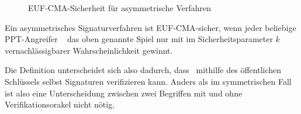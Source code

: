 \begin{definition}
\begin{figure}
\begin{center}
{ }
      \caption{EUF-CMA-Sicherheit für asymmetrische Verfahren}
      \label{abb:euf-cma-asym}
    \end{center}
  \end{figure}

  Ein asymmetrisches Signaturverfahren ist EUF-CMA-sicher, wenn jeder
  beliebige PPT-Angreifer \A~ das oben genannte Spiel nur mit im
  Sicherheitsparameter $k$ vernachlässigbarer Wahrscheinlichkeit gewinnt.
\end{definition}

Die Definition unterscheidet sich also dadurch, dass \A~mithilfe des
öffentlichen Schlüssels selbst Signaturen verifizieren kann. Anders als
im symmetrischen Fall ist also eine Unterscheidung zwischen zwei
Begriffen mit und ohne Verifikationsorakel nicht nötig.

